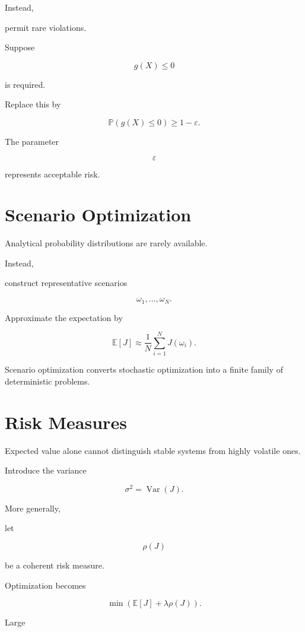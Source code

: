 \documentclass[11pt,fleqn]{book}
\numberwithin{equation}{chapter}
\theoremstyle{plain}
\theoremstyle{definition}
\theoremstyle{remark}
\begin{document}
Instead,

permit rare violations.

Suppose

\[
g(X)\le0
\]

is required.

Replace this by

\[
\boxed{
\mathbb P(g(X)\le0)
\ge
1-\varepsilon.
}
\]

The parameter

\[
\varepsilon
\]

represents acceptable risk.


\section{Scenario Optimization}

Analytical probability distributions are rarely available.

Instead,

construct representative scenarios

\[
\omega_1,\ldots,\omega_N.
\]

Approximate the expectation by

\[
\mathbb E[J]
\approx
\frac1N
\sum_{i=1}^N
J(\omega_i).
\]

Scenario optimization converts stochastic optimization into a finite
family of deterministic problems.


\section{Risk Measures}

Expected value alone cannot distinguish stable systems from highly
volatile ones.

Introduce the variance

\[
\sigma^2
=
\operatorname{Var}(J).
\]

More generally,

let

\[
\rho(J)
\]

be a coherent risk measure.

Optimization becomes

\[
\boxed{
\min
\left(
\mathbb E[J]
+
\lambda
\rho(J)
\right).
}
\]

Large
\end{document}
